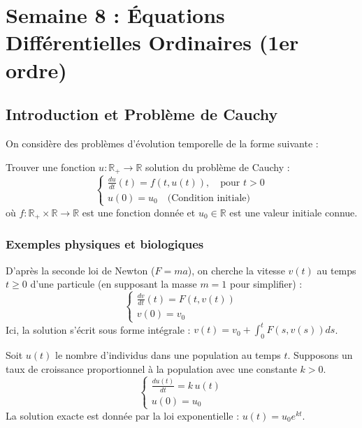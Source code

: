 \section{Semaine 8 : Équations Différentielles Ordinaires (1er ordre)}

\subsection{Introduction et Problème de Cauchy}

On considère des problèmes d'évolution temporelle de la forme suivante :

\begin{definition}
    Trouver une fonction $u : \mathbb{R}_+ \rightarrow \mathbb{R}$ solution du problème de Cauchy :
    \begin{equation}
        \tag{*}
        \begin{cases}
            \displaystyle \frac{du}{dt}(t) = f(t, u(t)), \quad \text{pour } t > 0 \\[0.3cm]
            u(0) = u_0 \quad \text{(Condition initiale)}
        \end{cases}
    \end{equation}
    où $f : \mathbb{R}_+ \times \mathbb{R} \rightarrow \mathbb{R}$ est une fonction donnée et $u_0 \in \mathbb{R}$ est une valeur initiale connue.
\end{definition}

\subsubsection*{Exemples physiques et biologiques}

\begin{exemple}
    D'après la seconde loi de Newton ($F=ma$), on cherche la vitesse $v(t)$ au temps $t \geq 0$ d'une particule (en supposant la masse $m=1$ pour simplifier) :
    \[
    \begin{cases}
        \displaystyle \frac{dv}{dt}(t) = F(t, v(t)) \\[0.3cm]
        v(0) = v_0
    \end{cases}
    \]
    Ici, la solution s'écrit sous forme intégrale : $v(t) = v_0 + \int_0^t F(s, v(s))ds$.
\end{exemple}

\begin{exemple}
    Soit $u(t)$ le nombre d'individus dans une population au temps $t$. Supposons un taux de croissance proportionnel à la population avec une constante $k > 0$.
    \[
    \begin{cases}
        \displaystyle \frac{du(t)}{dt} = k \, u(t) \\[0.3cm]
        u(0) = u_0
    \end{cases}
    \]
    La solution exacte est donnée par la loi exponentielle : $u(t) = u_0 e^{kt}$.
\end{exemple}

